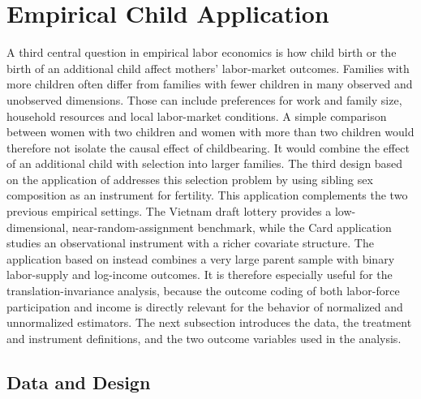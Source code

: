 \documentclass[12pt, a4paper, oneside]{article}
\theoremstyle{plain}
\theoremstyle{definition}
\begin{document}
\section{Empirical Child Application}
A third central question in empirical labor economics is how child birth or the birth of an additional child affect mothers' labor-market outcomes. 
Families with more children often differ from families with fewer children in many observed and unobserved dimensions. Those can include preferences for work and family size, household resources and local labor-market conditions. 
A simple comparison between women with two children and women with more than two children would therefore not isolate the causal effect of childbearing. It would combine the effect of an additional child with selection into larger families.
The third design based on the application of \citet{angrist1996children} addresses this selection problem by using sibling sex composition as an instrument for fertility. 
This application complements the two previous empirical settings. The Vietnam draft lottery provides a low-dimensional, near-random-assignment benchmark, while the Card application studies an observational instrument with a richer covariate structure. 
The application based on \citet{angrist1996children} instead combines a very large parent sample with binary labor-supply and log-income outcomes. It is therefore especially useful for the translation-invariance analysis, because the outcome coding of both labor-force participation and income is directly relevant for the behavior of normalized and unnormalized estimators.
The next subsection introduces the data, the treatment and instrument definitions, and the two outcome variables used in the analysis.

\subsection{Data and Design}
\end{document}
